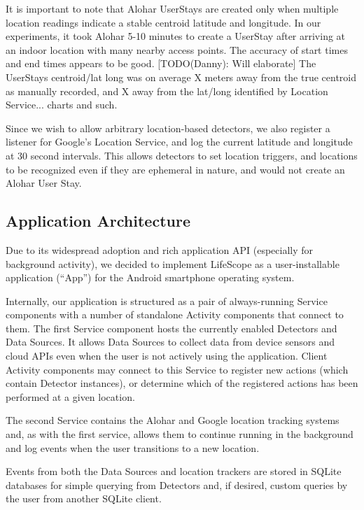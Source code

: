 \documentclass{acm_proc_article-sp}
\begin{document}
It is important to note that Alohar UserStays are created only when multiple location readings indicate a stable centroid latitude and longitude. In our experiments, it took Alohar 5-10 minutes to create a UserStay after arriving at an indoor location with many nearby access points. The accuracy of start times and end times appears to be good. [TODO(Danny): Will elaborate] The UserStays centroid/lat long was on average X meters away from the true centroid as manually recorded, and X away from the lat/long identified by Location Service... charts and such.

Since we wish to allow arbitrary location-based detectors, we also register a listener for Google's Location Service, and log the current latitude and longitude at 30 second intervals. This allows detectors to set location triggers, and locations to be recognized even if they are ephemeral in nature, and would not create an Alohar User Stay. 



\subsection {Application Architecture}
Due to its widespread adoption and rich application API (especially for background activity), we decided to implement LifeScope as a user-installable application (``App'') for the Android smartphone operating system.

Internally, our application is structured as a pair of always-running Service components with a number of standalone Activity components that connect to them. The first Service component hosts the currently enabled Detectors and Data Sources. It allows Data Sources to collect data from device sensors and cloud APIs even when the user is not actively using the application. Client Activity components may connect to this Service to register new actions (which contain Detector instances), or determine which of the registered actions has been performed at a given location.

The second Service contains the Alohar and Google location tracking systems and, as with the first service, allows them to continue running in the background and log events when the user transitions to a new location.

Events from both the Data Sources and location trackers are stored in SQLite databases for simple querying from Detectors and, if desired, custom queries by the user from another SQLite client.
\end{document}
